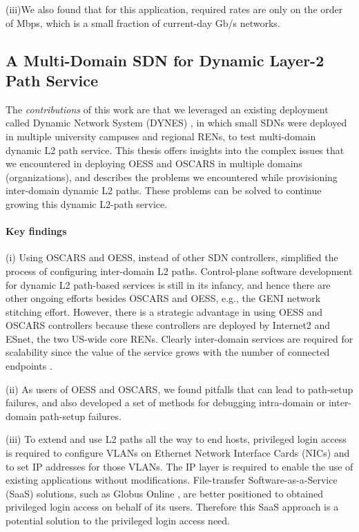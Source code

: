 (iii)We also found that for this application, required rates are only on
the order of Mbps, which is a small fraction of current-day Gb/s networks.

\subsection{A Multi-Domain SDN for Dynamic Layer-2 Path Service}
The \emph{contributions} of this work are that we leveraged an existing deployment
called Dynamic Network System (DYNES) \cite{1742-6596-396-4-042065}, in which small SDNs were deployed
in multiple university campuses and regional RENs, to test multi-domain dynamic L2 path service. This thesis
offers insights into the complex issues that we encountered in deploying OESS and OSCARS in multiple domains (organizations), and describes the problems we encountered while provisioning inter-domain dynamic L2 paths. These problems can be solved to continue growing this dynamic L2-path service.

\paragraph{Key findings}
(i) Using OSCARS and OESS, instead of other SDN controllers, simplified the process of configuring inter-domain L2 paths. Control-plane software development for dynamic L2 path-based services is still in its infancy, and hence there are other ongoing efforts besides OSCARS and OESS, e.g., the GENI network stitching \cite{GENI-stitching} effort. However, there is a strategic advantage in using OESS and OSCARS controllers because these controllers are deployed by Internet2 and ESnet, the two US-wide core RENs. Clearly inter-domain services are required for scalability since the value of the service grows with the number of connected endpoints \cite{odlyzko2005refutation}.

(ii) As users of OESS and OSCARS, we found pitfalls that can lead to path-setup failures, and also developed a set of methods for debugging intra-domain or inter-domain path-setup failures.

(iii) To extend and use L2 paths all the way to end hosts, privileged login access is required to configure VLANs on Ethernet Network Interface Cards (NICs) and to set IP addresses for those VLANs. The IP layer is required to enable the use of existing applications without modifications. File-transfer Software-as-a-Service (SaaS) solutions, such as Globus Online \cite{allen2012software}, are better positioned to obtained privileged login access on behalf of its users. Therefore this SaaS approach is a potential solution to the privileged login access need. 


